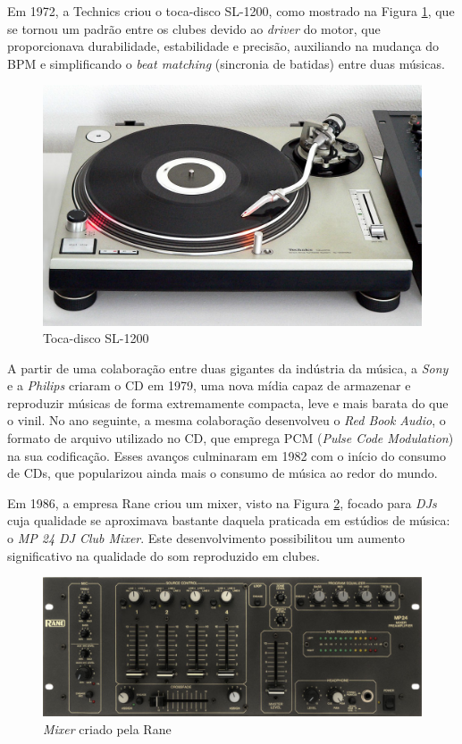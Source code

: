Em 1972, a Technics criou o toca-disco SL-1200, como mostrado na Figura \ref{fig14}, que se tornou um padrão entre os clubes devido ao \textit{driver} do motor, que proporcionava durabilidade, estabilidade e precisão, auxiliando na mudança do BPM e simplificando o \textit{beat matching} (sincronia de batidas) entre duas músicas.

\begin{figure}[h]
	\centering
    \includegraphics[scale=0.25]{figuras/fig14.png}
	\caption{Toca-disco SL-1200 \cite{wikimediaFileTechnicsSL1200MK22jpg}}
	\label{fig14}
\end{figure}

A partir de uma colaboração entre duas gigantes da indústria da música, a \textit{Sony} e a \textit{Philips} criaram o CD em 1979, uma nova mídia capaz de armazenar e reproduzir músicas de forma extremamente compacta, leve e mais barata do que o vinil. No ano seguinte, a mesma colaboração desenvolveu o \textit{Red Book Audio}, o formato de arquivo utilizado no CD, que emprega PCM (\textit{Pulse Code Modulation}) na sua codificação. Esses avanços culminaram em 1982 com o início do consumo de CDs, que popularizou ainda mais o consumo de música ao redor do mundo.

Em 1986, a empresa Rane criou um mixer, visto na Figura \ref{fig15}, focado para \textit{DJs} cuja qualidade se aproximava bastante daquela praticada em estúdios de música: o \textit{MP 24 DJ Club Mixer}. Este desenvolvimento possibilitou um aumento significativo na qualidade do som reproduzido em clubes.

\begin{figure}[h]
	\centering
    \includegraphics[scale=0.3]{figuras/fig15.eps}
	\caption{\textit{Mixer} criado pela Rane \cite{ranecommercialMixerEvolution}}
	\label{fig15}
\end{figure}

